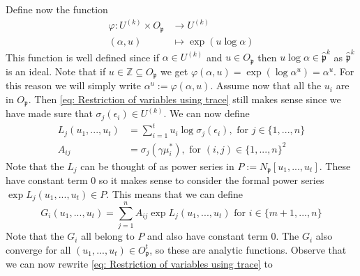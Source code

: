 \documentclass{article}
\newcommand{\mfrak}[1]{\mathfrak{#1}}
\newcommand{\mbb}[1]{\mathbb{#1}}
\begin{document}
Define now the function
\begin{equation*}\label{eq: Exponential function}
    \begin{split}
        \varphi : U^{(k)} \times O_\mfrak p &\to U^{(k)} \\
        (\alpha, u) &\mapsto \exp(u \log \alpha)
    \end{split}
\end{equation*}
This function is well defined since if $\alpha \in U^{(k)}$ and $u \in O_\mfrak p$ then $u \log \alpha \in \hat {\mfrak p}^k$ as $\hat {\mfrak p}^k$ is an ideal. Note that if $u \in \mbb Z \subseteq O_\mfrak p$ we get $\varphi(\alpha, u) = \exp(\log \alpha^u) = \alpha^u$. For this reason we will simply write $\alpha^u := \varphi(\alpha, u)$. Assume now that all the $u_i$ are in $O_\mfrak p$. Then \cref{eq: Restriction of variables using trace} still makes sense since we have made sure that $\sigma_j(\epsilon_i) \in U^{(k)}$. We can now define
\begin{align*}
    L_j(u_1, ..., u_t) &= \sum_{i = 1}^{t} u_i \log \sigma_j(\epsilon_i), \text{ for } j \in \{1, ..., n \} \\
    A_{ij} &= \sigma_j(\gamma \mu_i^*), \text{ for } (i,j) \in \{1, ..., n\}^2 
\end{align*}
Note that the $L_j$ can be thought of as power series in $P := N_\mfrak{p}[u_1, ..., u_t]$. These have constant term 0 so it makes sense to consider the formal power series $\exp L_j(u_1, ..., u_t) \in P$. This means that we can define
$$G_i(u_1, ..., u_t) = \sum_{j = 1}^n A_{ij} \exp L_j(u_1, ..., u_t) \text{ for } i \in \{m+1, ..., n \}$$
Note that the $G_i$ all belong to $P$ and also have constant term 0. The $G_i$ also converge for all $(u_1, ..., u_t) \in O_\mfrak p^t$, so these are analytic functions. Observe that we can now rewrite \cref{eq: Restriction of variables using trace} to
\end{document}
